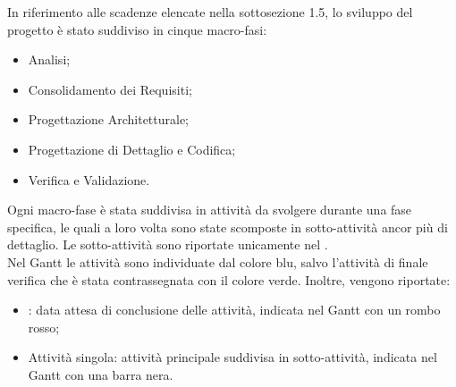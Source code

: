 In riferimento alle scadenze elencate nella sottosezione 1.5, lo sviluppo del progetto è stato suddiviso in cinque macro-fasi:
\begin{itemize}
\item{Analisi;}
\item{Consolidamento dei Requisiti;}
\item{Progettazione Architetturale;}
\item{Progettazione di Dettaglio e Codifica;}
\item{Verifica e Validazione.}
\end{itemize}

Ogni macro-fase è stata suddivisa in attività da svolgere durante una fase specifica, le quali a loro volta sono state scomposte in sotto-attività ancor più di dettaglio. Le sotto-attività sono riportate unicamente nel . \\ Nel Gantt le attività sono individuate dal colore blu, salvo l'attività di finale verifica che è stata contrassegnata con il colore verde. Inoltre, vengono riportate:
\begin{itemize}
\item{: data attesa di conclusione delle attività, indicata nel Gantt con un rombo rosso;}
\item{Attività singola: attività principale suddivisa in sotto-attività, indicata nel Gantt con una barra nera.}
\end{itemize}
\pagebreak






